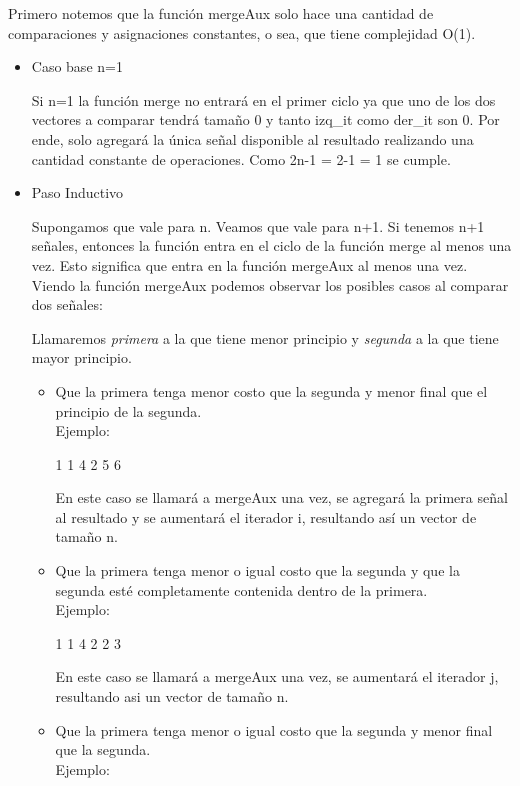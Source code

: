  Primero notemos que la función mergeAux solo hace una cantidad de comparaciones y asignaciones constantes, o sea, que tiene complejidad O(1).
\begin{itemize} 
\item Caso base n=1


Si n=1 la función merge no entrará en el primer ciclo ya que uno de los dos vectores a comparar tendrá tamaño 0 y tanto izq_it como der_it son 0. Por ende, solo agregará la única señal disponible al resultado realizando una cantidad constante de operaciones. Como 2n-1 = 2-1 = 1 se cumple.
 
\item Paso Inductivo

Supongamos que vale para n. Veamos que vale para n+1. Si tenemos n+1 señales, entonces la función entra en el ciclo de la función merge al menos una vez. Esto significa que entra en la función mergeAux al menos una vez. Viendo la función mergeAux podemos observar los posibles casos al comparar dos señales:

Llamaremos \textit{primera} a la que tiene menor principio y \textit{segunda} a la que tiene mayor principio.

\begin{itemize}
\item Que la primera tenga menor costo que la segunda y menor final que el principio de la segunda.\\
Ejemplo:

\begin{codesnippet}
1 1 4
2 5 6
\end{codesnippet}

En este caso se llamará a mergeAux una vez, se agregará la primera señal al resultado y se aumentará el iterador i, resultando así un vector de tamaño n.

\item Que la primera tenga menor o igual costo que la segunda y que la segunda esté completamente contenida dentro de la primera.\\
Ejemplo:

\begin{codesnippet}
1 1 4
2 2 3
\end{codesnippet}

En este caso se llamará a mergeAux una vez, se aumentará el iterador j, resultando asi un vector de tamaño n.

\item Que la primera tenga menor o igual costo que la segunda y menor final que la segunda.\\
Ejemplo:


\end{itemize}
\end{itemize}
